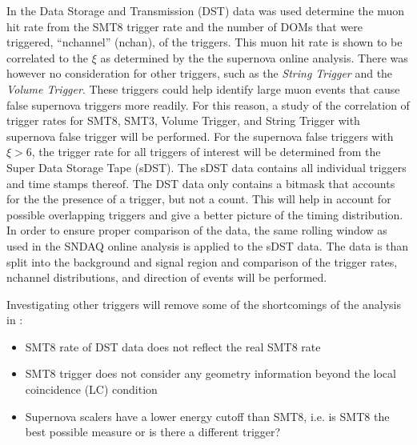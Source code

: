 
In \cite{vbaumaster} the Data Storage and Transmission (DST) data was used determine the muon hit rate from the SMT8 trigger rate and the number of DOMs that were triggered, ``nchannel'' (nchan), of the triggers. This muon hit rate is shown to be correlated to the $\xi$ as determined by the the supernova online analysis. There was however no consideration for other triggers, such as the \emph{String Trigger} and the \emph{Volume Trigger}. These triggers could help identify large muon events that cause false supernova triggers more readily. For this reason, a study of the correlation of trigger rates for SMT8, SMT3, Volume Trigger, and String Trigger with supernova false trigger will be performed. For the supernova false triggers with $\xi > 6$, the trigger rate for all triggers of interest will be determined from the Super Data Storage Tape (sDST). The sDST data contains all individual triggers and time stamps thereof. The DST data only contains a bitmask that accounts for the the presence of a trigger, but not a count. This will help in account for possible overlapping triggers and give a better picture of the timing distribution. In order to ensure proper comparison of the data, the same rolling window as used in the SNDAQ online analysis is applied to the sDST data. The data is than split into the background and signal region and comparison of the trigger rates, nchannel distributions, and direction of events will be performed.

Investigating other triggers will remove some of the shortcomings of the analysis in \cite{vbaumaster}:

\begin{itemize}
  \item SMT8 rate of DST data does not reflect the real SMT8 rate
  \item SMT8 trigger does not consider any geometry information beyond the local coincidence (LC) condition
  \item Supernova scalers have a lower energy cutoff than SMT8, i.e. is SMT8 the best possible measure or is there a different trigger?
\end{itemize}


